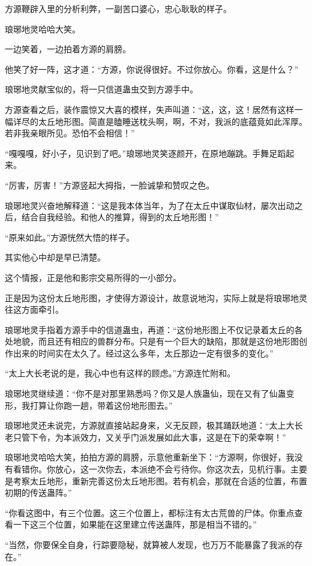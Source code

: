\begin{this_body}
方源鞭辟入里的分析利弊，一副苦口婆心，忠心耿耿的样子。

琅琊地灵哈哈大笑。

一边笑着，一边拍着方源的肩膀。

他笑了好一阵，这才道：“方源，你说得很好。不过你放心。你看，这是什么？”

琅琊地灵献宝似的，将一只信道蛊虫交到方源手中。

方源查看之后，装作震惊又大喜的模样，失声叫道：“这，这，这！居然有这样一幅详尽的太丘地形图。简直是瞌睡送枕头啊，啊，不对，我派的底蕴竟如此浑厚。若非我亲眼所见。恐怕不会相信！”

“嘎嘎嘎，好小子，见识到了吧。”琅琊地灵笑逐颜开，在原地蹦跳。手舞足蹈起来。

“厉害，厉害！”方源竖起大拇指，一脸诚挚和赞叹之色。

琅琊地灵兴奋地解释道：“这是我本体当年，为了在太丘中谋取仙材，屡次出动之后，结合自我经验。和他人的推算，得到的太丘地形图！”

“原来如此。”方源恍然大悟的样子。

其实他心中却是早已清楚。

这个情报，正是他和影宗交易所得的一小部分。

正是因为这份太丘地形图，才使得方源设计，故意说地沟，实际上就是将琅琊地灵往这方面牵引。

琅琊地灵手指着方源手中的信道蛊虫，再道：“这份地形图上不仅记录着太丘的各处地貌，而且还有相应的兽群分布。只是有一个巨大的缺陷，那就是这份地形图创作出来的时间实在太久了。经过这么多年，太丘那边一定有很多的变化。”

“太上大长老说的是，我心中也有这样的顾虑。”方源连忙附和。

琅琊地灵继续道：“你不是对那里熟悉吗？你又是人族蛊仙，现在又有了仙蛊变形，我打算让你跑一趟，带着这份地形图去。”

琅琊地灵还未说完，方源就直接站起身来，义无反顾，极其踊跃地道：“太上大长老只管下令，为本派效力，又关乎门派发展如此大事，这是在下的荣幸啊！”

琅琊地灵哈哈大笑，拍拍方源的肩膀，示意他重新坐下：“方源啊，你很好，我没有看错你。你放心，这一次你去，本派绝不会亏待你。你这次去，见机行事。主要是考察太丘地形，重新完善这份太丘地形图。若有机会，那就在合适的位置，布置初期的传送蛊阵。”

“你看这图中，有三个位置。这三个位置上，都标注有太古荒兽的尸体。你重点查看一下这三个位置，如果能在这里建立传送蛊阵，那是相当不错的。”

“当然，你要保全自身，行踪要隐秘，就算被人发现，也万万不能暴露了我派的存在。”


\end{this_body}
